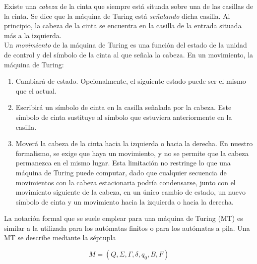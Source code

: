 Existe una \emph{cabeza} de la cinta que siempre está situada sobre una de las casillas de la cinta. Se dice que la máquina de Turing está \emph{señalando} dicha casilla. Al principio, la cabeza de la cinta se encuentra en la casilla de la entrada situada más a la izquierda.\\

Un \emph{movimiento} de la máquina de Turing es una función del estado de la unidad de control y del símbolo de la cinta al que señala la cabeza. En un movimiento, la máquina de Turing:
\begin{enumerate}
\item Cambiará de estado. Opcionalmente, el siguiente estado puede ser el mismo que el actual.
\item Escribirá un símbolo de cinta en la casilla señalada por la cabeza. Este símbolo de cinta sustituye al símbolo que estuviera anteriormente en la casilla.
\item Moverá la cabeza de la cinta hacia la izquierda o hacia la derecha. En nuestro formalismo, se exige que haya un movimiento, y no se permite que la cabeza permanezca en el mismo lugar. Esta limitación no restringe lo que una máquina de Turing puede computar, dado que cualquier secuencia de movimientos con la cabeza estacionaria podría condensarse, junto con el movimiento siguiente de la cabeza, en un único cambio de estado, un nuevo símbolo de cinta y un movimiento hacia la izquierda o hacia la derecha.
\end{enumerate}

La notación formal que se suele emplear para una máquina de Turing (MT) es similar a la utilizada para los autómatas finitos o para los autómatas a pila. Una MT se describe mediante la séptupla

\[ M = (Q, \Sigma, \Gamma, \delta, q_0, B, F) \]

